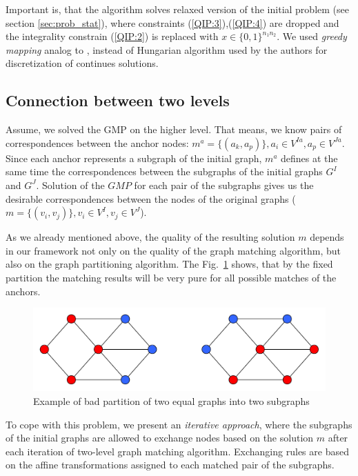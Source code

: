 Important is, that the algorithm solves relaxed version of the initial problem (see section \ref{sec:prob_stat}), where constraints (\ref{QIP:3}),(\ref{QIP:4}) are dropped and the integrality constrain (\ref{QIP:2}) is replaced with $x\in \{0,1\}^{n_1n_2}$. We used \emph{greedy mapping} analog to \cite{Leordeanu2005}, instead of Hungarian algorithm used by the authors for discretization of continues solutions.

\subsection{Connection between two levels}
Assume, we solved the GMP on the higher level. That means, we know pairs of correspondences between the anchor nodes: $m^a = \{(a_k, a_p)\}, a_i\in V^{Ia}, a_p\in V^{Ja}$. Since each anchor represents a subgraph of the initial graph, $m^a$ defines at the same time the correspondences between the subgraphs of the initial graphs $G^I$ and $G^J$. Solution of the $GMP$ for each pair of the subgraphs gives us the desirable correspondences between the nodes of the original graphs ($m = \{(v_i, v_j)\}, v_i\in V^{I}, v_j\in V^{J}$).

As we already mentioned above, the quality of the resulting solution $m$ depends in our framework not only on the quality of the graph matching algorithm, but also on the graph partitioning algorithm. The Fig.~\ref{fig:badpartition} shows, that by the fixed partition the matching results will be very pure for all possible matches of the anchors.

\begin{figure}
	\centering
	\includegraphics[scale=0.35]{chapter2/fig/badpartition.pdf}
	\caption{Example of bad partition of two equal graphs into two subgraphs} \label{fig:badpartition}
\end{figure}


To cope with this problem, we present an \emph{iterative approach}, where the subgraphs of the initial graphs are allowed to exchange nodes based on the solution $m$ after each iteration of two-level graph matching algorithm. Exchanging rules are based on the affine transformations assigned to each matched pair of the subgraphs.

